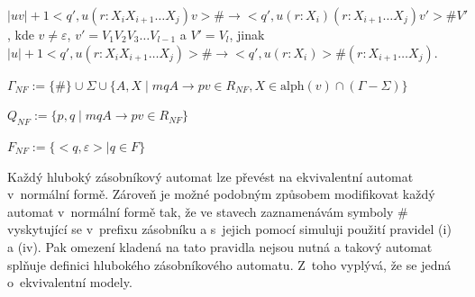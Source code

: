 \begin{Alg}
\begin{list}{}{\setlength\parsep{0cm} \setlength\itemsep{0cm} \setlength\leftmargin{1em}}
  \subsubitem $|uv|+1 <q',u(r : X_i X_{i+1} \dots X_j)v> \# \rightarrow <q',u(r : X_i) (r: X_{i+1} \dots X_j)v'>\# V' $,
  \subsubitem kde $v \ne \varepsilon$, $v' = V_1 V_2 V_3 \dots V_{l-1}$ a $V'=V_l$, jinak \medskip
  \subsubitem $|u|+1 <q',u(r : X_i X_{i+1} \dots X_j)> \# \rightarrow <q',u(r : X_i)>\# (r: X_{i+1} \dots X_j)$.\bigskip

  \item ${\Gamma}_{NF} :=\{\#\} \cup \Sigma \cup \{A, X \mid mqA \rightarrow pv \in R_{NF}, X \in \mathrm{alph}(v) \cap (\Gamma - \Sigma) \}$
  \item $Q_{NF} := \{p,q \mid mqA \rightarrow pv \in R_{NF}\} $
  \item $F_{NF} := \{<q, \varepsilon> \mid  q \in F \}$


\end{list}
\end{Alg}

Každý hluboký zásobníkový automat lze převést na ekvivalentní automat v~normální formě. Zároveň je možné podobným způsobem modifikovat každý automat v~normální formě tak, že ve stavech zaznamenávám symboly $\#$ vyskytující se v~prefixu zásobníku a s~jejich pomocí simuluji použití pravidel (i) a (iv). Pak omezení kladená na tato pravidla nejsou nutná a takový automat splňuje definici hlubokého zásobníkového automatu. Z~toho vyplývá, že se jedná o~ekvivalentní modely.


